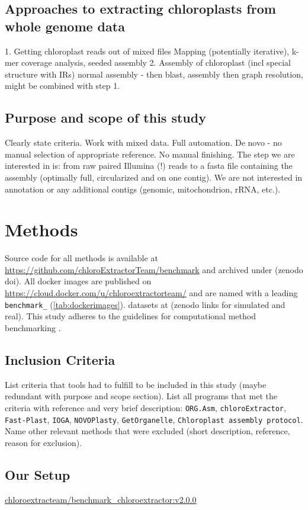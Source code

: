 \documentclass{bmcart}
\newcommand{\formatprogramnames}[1]{\texttt{#1}}
\newcommand{\ce}{\formatprogramnames{chloroExtractor}}
\newcommand{\oa}{\formatprogramnames{ORG.Asm}}
\newcommand{\fp}{\formatprogramnames{Fast-Plast}}
\newcommand{\ioga}{\formatprogramnames{IOGA}}
\newcommand{\np}{\formatprogramnames{NOVOPlasty}}
\newcommand{\go}{\formatprogramnames{GetOrganelle}}
\newcommand{\cassp}{\formatprogramnames{Chloroplast assembly protocol}}
\newcommand{\docker}[2]{\href{https://cloud.docker.com/u/chloroextractorteam/repository/docker/chloroextractorteam/#1}{chloroextracteam/#1:#2}}
\newcommand{\dockerce}{\docker{benchmark\_chloroextractor}{v2.0.0}}
\begin{document}
\subsection*{Approaches to extracting chloroplasts from whole genome data}
1. Getting chloroplast reads out of mixed files
Mapping (potentially iterative), k-mer coverage analysis, seeded assembly
2. Assembly of chloroplast (incl special structure with IRs)
normal assembly - then blast, assembly then graph resolution, might be combined with step 1.

\subsection*{Purpose and scope of this study}
Clearly state criteria. Work with mixed data. Full automation. De novo - no manual selection of appropriate reference. No manual finishing. The step we are interested in is: from raw paired Illumina (!) reads to a fasta file containing the assembly (optimally full, circularized and on one contig). We are not interested in annotation or any additional contigs (genomic, mitochondrion, rRNA, etc.).

\section*{Methods}
Source code for all methods is available at \url{https://github.com/chloroExtractorTeam/benchmark} and archived under (zenodo doi).
All docker images are published on \url{https://cloud.docker.com/u/chloroextractorteam/} and are named with a leading \texttt{benchmark\_} (\cref{tab:dockerimages}).
datasets at (zenodo links for simulated and real).
This study adheres to the guidelines for computational method benchmarking \cite{weber_essential_2018}.

\subsection*{Inclusion Criteria}
List criteria that tools had to fulfill to be included in this study (maybe redundant with purpose and scope section).
List all programs that met the criteria with reference and very brief description:
\oa{}, \ce{}, \fp{}, \ioga{}, \np{}, \go{}, \cassp{}.
Name other relevant methods that were excluded (short description, reference, reason for exclusion).

\subsection*{Our Setup}
\dockerce{}
\end{document}
